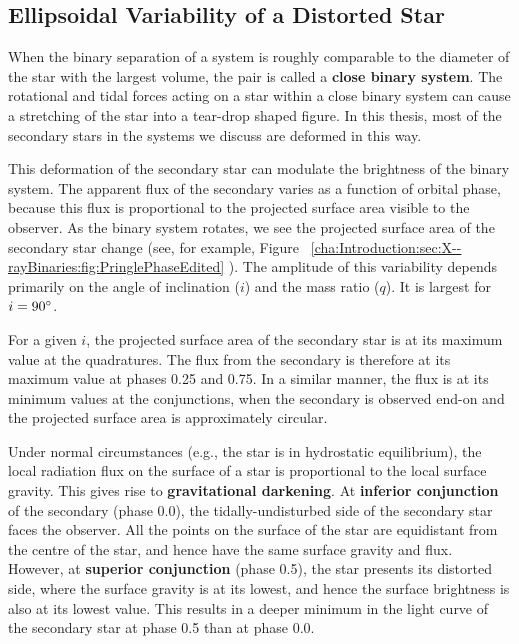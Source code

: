 
\subsection{Ellipsoidal Variability of a Distorted Star}\label{cha:Introduction:sec:X--rayBinaries:subsec:EllipsoidalVariability}

When the binary separation of a system is roughly comparable to the
diameter of the star with the largest volume, the pair is called a
\textbf{close binary system}. %
The rotational and tidal forces acting on a star within a close binary
system can cause a stretching of the star into a tear-drop shaped
figure. In this thesis, most of the secondary stars in the systems we discuss are deformed in this way. %

\vspace{\myparskip}

This deformation of the secondary star can modulate the brightness of the binary system. %
The apparent flux of the secondary varies as a function of orbital phase, because this flux is
proportional to the projected surface area %
visible to the observer. As the binary system rotates, we see the projected surface area of the secondary star change (see, for example, Figure~%
\vref{cha:Introduction:sec:X--rayBinaries:fig:PringlePhaseEdited}%
). The amplitude of this variability depends primarily on the angle of inclination ($i$) and the mass ratio ($q$). It is largest for $i=90\hbox{$^\circ$}$. %

\vspace{\myparskip}

For a given $i$, the projected surface area of the secondary star is
at its maximum value at the quadratures. The flux from the secondary is therefore at
its maximum value at phases 0.25 and 0.75. In a similar manner, the
flux is at its minimum values at the conjunctions, when the secondary is observed end-on and the
projected surface area is approximately circular. %

\vspace{\myparskip}

Under normal circumstances (e.g., the star is in hydrostatic
equilibrium), the local radiation flux on the surface of a star is
proportional to the local surface gravity. %
This gives rise to \textbf{gravitational darkening}. %
At \textbf{inferior conjunction} of the secondary (phase 0.0), the tidally-undisturbed side of the
secondary star faces the observer. All the points on the surface of
the star are equidistant from the centre of the star, and hence have the
same surface gravity and flux. %
However, at \textbf{superior conjunction} (phase 0.5), the star presents its distorted side, where the surface gravity is at its lowest, and hence the surface brightness
is also at its lowest value. This results in a deeper minimum in the light curve of the secondary star at phase 0.5 than at phase 0.0.

